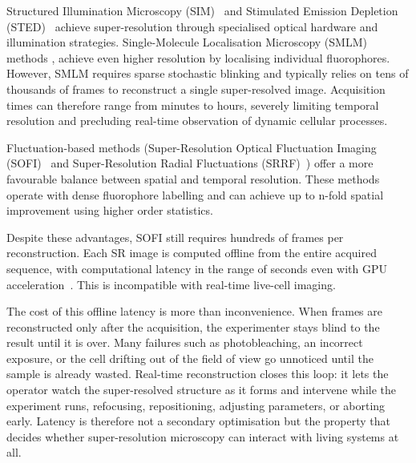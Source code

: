 
Structured Illumination Microscopy (SIM)~\cite{sim2000,gustafsson2000sim} 
and Stimulated Emission Depletion (STED)~\cite{sted1994} 
achieve super-resolution through specialised optical hardware and 
illumination strategies.
Single-Molecule Localisation Microscopy (SMLM) methods \cite{betzig_2006_imaging,rust_2006_subdiffractionlimit}, 
achieve even higher resolution by localising individual fluorophores. 
However, SMLM requires sparse stochastic blinking and typically relies on 
tens of thousands of frames to reconstruct a single super-resolved image. 
Acquisition times can therefore range from minutes to hours, 
severely limiting temporal resolution and precluding real-time observation of 
dynamic cellular processes.

Fluctuation-based methods (Super-Resolution Optical Fluctuation Imaging
(SOFI)~\cite{sofi2009} and Super-Resolution Radial Fluctuations
(SRRF)~\cite{srrf2016}) offer a more favourable balance between spatial and temporal resolution.
These methods operate with dense fluorophore labelling and can achieve up to n-fold spatial improvement using higher order statistics.
 
Despite these advantages, SOFI still requires hundreds of frames per
reconstruction.
Each SR image is computed offline from the entire acquired sequence, with
computational latency in the range of seconds even with GPU
acceleration~\cite{resurf2024}.
This is incompatible with real-time live-cell imaging.

The cost of this offline latency is more than inconvenience. When frames are
reconstructed only after the acquisition, the experimenter stays blind to the result
until it is over. Many failures such as
photobleaching, an incorrect exposure, or the cell drifting out of the field of
view go unnoticed until the sample is already wasted. 
Real-time reconstruction closes this loop: it lets the
operator watch the super-resolved structure as it forms and intervene while the
experiment runs, refocusing, repositioning, adjusting parameters, or aborting early.
Latency is therefore not a secondary optimisation but the property that decides
whether super-resolution microscopy can interact with living systems at all.

